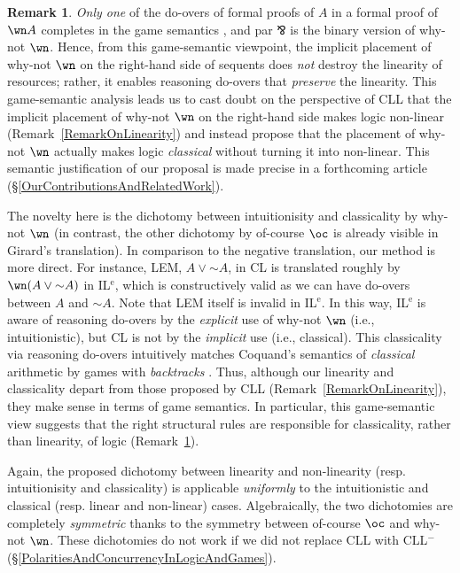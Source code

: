 \documentclass[a4paper]{article}
\theoremstyle{definition}
\newtheorem{remark}[definition]{Remark}
\theoremstyle{theorem}
\theoremstyle{remark}
\begin{document}
\begin{remark}
\label{RemarkOnBacktracks}
\emph{Only one} of the do-overs of formal proofs of $A$ in a formal proof of $\wn A$ completes in the game semantics \cite{laurent2002polarized}, and par $\invamp$ is the binary version of why-not $\wn$.
Hence, from this game-semantic viewpoint, the implicit placement of why-not $\wn$ on the right-hand side of sequents does \emph{not} destroy the linearity of resources; rather, it enables reasoning do-overs that \emph{preserve} the linearity.
This game-semantic analysis leads us to cast doubt on the perspective of CLL that the implicit placement of why-not $\wn$ on the right-hand side makes logic non-linear (Remark~\ref{RemarkOnLinearity}) and instead propose that the placement of why-not $\wn$ actually makes logic \emph{classical} without turning it into non-linear.
This semantic justification of our proposal is made precise in a forthcoming article (\S\ref{OurContributionsAndRelatedWork}).
\end{remark}

The novelty here is the dichotomy between intuitionisity and classicality by why-not $\wn$ (in contrast, the other dichotomy by of-course $\oc$ is already visible in Girard's translation).
In comparison to the negative translation, our method is more direct.
For instance, LEM, $A \vee \mathbin{\sim} A$, in CL is translated roughly by $\wn (A \vee \mathbin{\sim} A)$ in IL$^{\text{e}}$, which is constructively valid \cite{laurent2002polarized} as we can have do-overs between $A$ and $\mathbin{\sim} A$.
Note that LEM itself is invalid in IL$^{\text{e}}$.
In this way, IL$^{\text{e}}$ is aware of reasoning do-overs by the \emph{explicit} use of why-not $\wn$ (i.e., intuitionistic), but CL is not by the \emph{implicit} use (i.e., classical).
This classicality via reasoning do-overs intuitively matches Coquand's semantics of \emph{classical} arithmetic by games with \emph{backtracks} \cite{coquand1995semantics}.
Thus, although our linearity and classicality depart from those proposed by CLL (Remark~\ref{RemarkOnLinearity}), they make sense in terms of game semantics.
In particular, this game-semantic view suggests that the right structural rules are responsible for classicality, rather than linearity, of logic (Remark~\ref{RemarkOnBacktracks}).

Again, the proposed dichotomy between linearity and non-linearity (resp. intuitionisity and classicality) is applicable \emph{uniformly} to the intuitionistic and classical (resp. linear and non-linear) cases.
Algebraically, the two dichotomies are completely \emph{symmetric} thanks to the symmetry between of-course $\oc$ and why-not $\wn$.
These dichotomies do not work if we did not replace CLL with CLL$^-$ (\S\ref{PolaritiesAndConcurrencyInLogicAndGames}).
\end{document}
